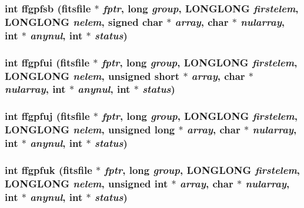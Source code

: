 \subsubsection{\setlength{\rightskip}{0pt plus 5cm}int ffgpfsb (\bf{fitsfile} $\ast$ {\em fptr}, long {\em group}, \bf{LONGLONG} {\em firstelem}, \bf{LONGLONG} {\em nelem}, signed char $\ast$ {\em array}, char $\ast$ {\em nularray}, int $\ast$ {\em anynul}, int $\ast$ {\em status})}\label{test_2shm__client_2fitsio_8h_d9472db2fdb501fccf5c65359329a9d6}


\subsubsection{\setlength{\rightskip}{0pt plus 5cm}int ffgpfui (\bf{fitsfile} $\ast$ {\em fptr}, long {\em group}, \bf{LONGLONG} {\em firstelem}, \bf{LONGLONG} {\em nelem}, unsigned short $\ast$ {\em array}, char $\ast$ {\em nularray}, int $\ast$ {\em anynul}, int $\ast$ {\em status})}\label{test_2shm__client_2fitsio_8h_37540a1aeebbe1a4d6a20df96204a615}


\subsubsection{\setlength{\rightskip}{0pt plus 5cm}int ffgpfuj (\bf{fitsfile} $\ast$ {\em fptr}, long {\em group}, \bf{LONGLONG} {\em firstelem}, \bf{LONGLONG} {\em nelem}, unsigned long $\ast$ {\em array}, char $\ast$ {\em nularray}, int $\ast$ {\em anynul}, int $\ast$ {\em status})}\label{test_2shm__client_2fitsio_8h_45489521b50ea72a1b13a57a1bdc6180}


\subsubsection{\setlength{\rightskip}{0pt plus 5cm}int ffgpfuk (\bf{fitsfile} $\ast$ {\em fptr}, long {\em group}, \bf{LONGLONG} {\em firstelem}, \bf{LONGLONG} {\em nelem}, unsigned int $\ast$ {\em array}, char $\ast$ {\em nularray}, int $\ast$ {\em anynul}, int $\ast$ {\em status})}\label{test_2shm__client_2fitsio_8h_e184edd1d62907a447c3bce7618b8c57}


